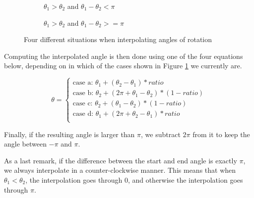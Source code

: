 \begin{figure}[h!]
\begin{subfigure}[b]{0.475\textwidth}
    \caption{$\theta_1 > \theta_2$ and $\theta_1 - \theta_2 < \pi$}
\end{subfigure}
\hfill
\begin{subfigure}[b]{0.475\textwidth}
    \centering
    \caption{$\theta_1 > \theta_2$ and $\theta_1 - \theta_2 >= \pi$}
\end{subfigure}
\caption{Four different situations when interpolating angles of rotation}
\label{fig:interpolation_situations}
\end{figure}

Computing the interpolated angle is then done using one of the four equations below, depending on in which of the cases shown in Figure \ref{fig:interpolation_situations} we currently are.

\[
    \theta = 
    \begin{cases}
        \text{case a: } \theta_1 + (\theta_2 - \theta_1)*ratio \\
        \text{case b: } \theta_2 + (2\pi + \theta_1 - \theta_2)*(1 - ratio) \\
        \text{case c: } \theta_2 + (\theta_1 - \theta_2)*(1 - ratio) \\
        \text{case d: } \theta_1 + (2\pi + \theta_2 - \theta_1)*ratio \\
    \end{cases}
\]

Finally, if the resulting angle is larger than $\pi$, we subtract $2\pi$ from it to keep the angle between $-\pi$ and $\pi$.

As a last remark, if the difference between the start and end angle is exactly $\pi$, we always interpolate in a counter-clockwise manner. This means that when $\theta_1 < \theta_2$, the interpolation goes through $0$, and otherwise the interpolation goes through $\pi$.

